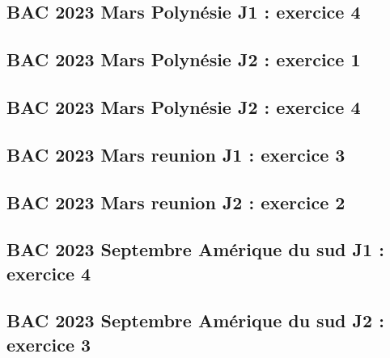 \documentclass[lang=fr,edition=teacher,layout=sheet]{mxbook}
\begin{document}
\par\bigskip
{}\subsection*{BAC 2023 Mars Polynésie J1 : exercice 4}
\begingroup\endgroup
\par\bigskip
{}\subsection*{BAC 2023 Mars Polynésie J2 : exercice 1}
\begingroup\endgroup
\par\bigskip
{}\subsection*{BAC 2023 Mars Polynésie J2 : exercice 4}
\begingroup\endgroup
\par\bigskip
{}\subsection*{BAC 2023 Mars reunion J1 : exercice 3}
\begingroup\endgroup
\par\bigskip
{}\subsection*{BAC 2023 Mars reunion J2 : exercice 2}
\begingroup\endgroup
\par\bigskip
{}\subsection*{BAC 2023 Septembre Amérique du sud J1 : exercice 4}
\begingroup\endgroup
\par\bigskip
{}\subsection*{BAC 2023 Septembre Amérique du sud J2 : exercice 3}
\end{document}
